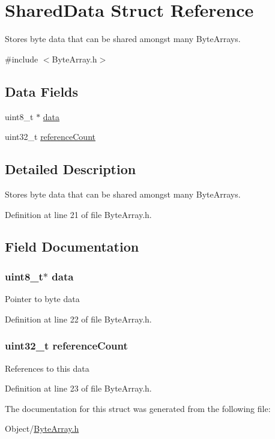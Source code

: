 \hypertarget{struct_m_i_shared_data}{
\section{SharedData Struct Reference}
\label{struct_m_i_shared_data}
}


Stores byte data that can be shared amongst many ByteArrays.  




{\ttfamily \#include $<$ByteArray.h$>$}

\subsection*{Data Fields}
\begin{DoxyCompactItemize}
\item 
uint8\_\-t $\ast$ \hyperlink{struct_m_i_shared_data_abe222f6d3581e7920dcad5306cc906a8}{data}
\item 
uint32\_\-t \hyperlink{struct_m_i_shared_data_ad83c3d5d3f46e6278a77cb80eb2a0705}{referenceCount}
\end{DoxyCompactItemize}


\subsection{Detailed Description}
Stores byte data that can be shared amongst many ByteArrays. 

Definition at line 21 of file ByteArray.h.



\subsection{Field Documentation}
\hypertarget{struct_m_i_shared_data_abe222f6d3581e7920dcad5306cc906a8}{
\subsubsection[{data}]{\setlength{\rightskip}{0pt plus 5cm}uint8\_\-t$\ast$ {\bf data}}}
\label{struct_m_i_shared_data_abe222f6d3581e7920dcad5306cc906a8}
Pointer to byte data 

Definition at line 22 of file ByteArray.h.

\hypertarget{struct_m_i_shared_data_ad83c3d5d3f46e6278a77cb80eb2a0705}{
\subsubsection[{referenceCount}]{\setlength{\rightskip}{0pt plus 5cm}uint32\_\-t {\bf referenceCount}}}
\label{struct_m_i_shared_data_ad83c3d5d3f46e6278a77cb80eb2a0705}
References to this data 

Definition at line 23 of file ByteArray.h.



The documentation for this struct was generated from the following file:\begin{DoxyCompactItemize}
\item 
Object/\hyperlink{_m_i_byte_array_8h}{ByteArray.h}\end{DoxyCompactItemize}
